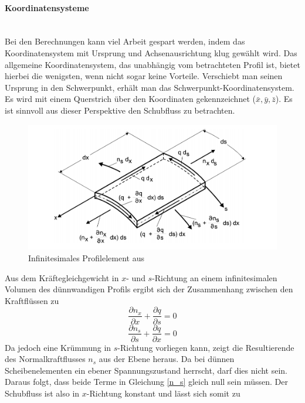 \paragraph{Koordinatensysteme}~\\
Bei den Berechnungen kann viel Arbeit gespart werden, indem das Koordinatensystem mit Ursprung und Achsenausrichtung klug gewählt wird. Das allgemeine Koordinatensystem, das unabhängig vom betrachteten Profil ist, bietet hierbei die wenigsten, wenn nicht sogar keine Vorteile. Verschiebt man seinen Ursprung in den Schwerpunkt, erhält man das Schwerpunkt-Koordinatensystem. Es wird mit einem Querstrich über den Koordinaten gekennzeichnet ($\bar{x},\bar{y},\bar{z}$). Es ist sinnvoll aus dieser Perspektive den Schubfluss zu betrachten.
\begin{figure}[h]
	\centering
	\includegraphics[width=1\textwidth]{Bilder/schubfluss-infinit}
	\caption{Infinitesimales Profilelement aus \cite{item15}}
	\label{schubfluss-infinit}
\end{figure}
Aus dem Kräftegleichgewicht in $x$- und $s$-Richtung an einem infinitesimalen Volumen des dünnwandigen Profils ergibt sich der Zusammenhang zwischen den Kraftflüssen zu
\begin{equation}
	\frac{\partial n_x}{\partial x} + \frac{\partial q}{\partial s} = 0
\end{equation}
\begin{equation}\label{n_s}
	\frac{\partial n_s}{\partial s} + \frac{\partial q}{\partial x} = 0
\end{equation}
Da jedoch eine Krümmung in $s$-Richtung vorliegen kann, zeigt die Resultierende des Normalkraftflusses $n_s$ aus der Ebene heraus. Da bei dünnen Scheibenelementen ein ebener Spannungszustand herrscht, darf dies nicht sein. Daraus folgt, dass beide Terme in Gleichung \ref{n_s} gleich null sein müssen. Der Schubfluss ist also in $x$-Richtung konstant und lässt sich somit zu
